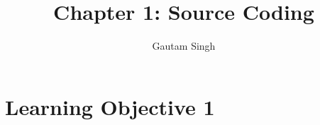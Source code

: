 \documentclass[journal,12pt,twocolumn]{IEEEtran}
\begin{document}
\providecommand{\dec}[2]{\ensuremath{\overset{#1}{\underset{#2}{\gtrless}}}}
\let\StandardTheFigure\thefigure
\def\putbox#1#2#3{\makebox[0in][l]{\makebox[#1][l]{}\raisebox{\baselineskip}[0in][0in]{\raisebox{#2}[0in][0in]{#3}}}}
     \def\rightbox#1{\makebox[0in][r]{#1}}
     \def\centbox#1{\makebox[0in]{#1}}
     \def\topbox#1{\raisebox{-\baselineskip}[0in][0in]{#1}}
     \def\midbox#1{\raisebox{-0.5\baselineskip}[0in][0in]{#1}}
\vspace{3cm}
\title{Chapter 1: Source Coding}
\author{Gautam Singh}
\maketitle
\bigskip

\section{Learning Objective 1}
\end{document}
